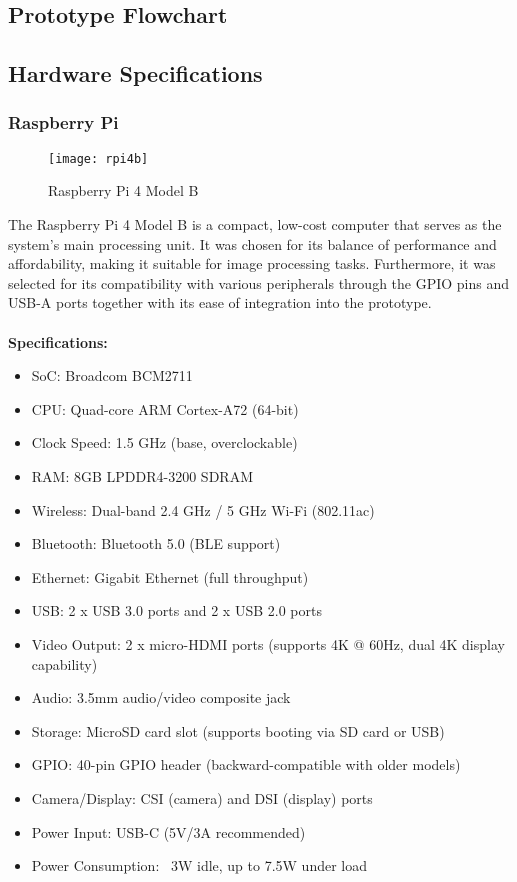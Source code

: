 \subsection{Prototype Flowchart}

\subsection{Hardware Specifications}

\subsubsection{Raspberry Pi}
\begin{figure}[!htbp]
	\centering
	\texttt{[image: rpi4b]}
	\caption{Raspberry Pi 4 Model B}
	\label{fig:rpi4b_fig}
\end{figure}
The Raspberry Pi 4 Model B is a compact, low-cost computer that serves as the system's main processing unit. 
It was chosen for its balance of performance and affordability, making it suitable for image processing tasks.
Furthermore, it was selected for its compatibility with various peripherals through the GPIO pins and USB-A ports together
with its ease of integration into the prototype.
\\
\\
\textbf{Specifications:}
\begin{itemize}
    \item SoC: Broadcom BCM2711
    \item CPU: Quad-core ARM Cortex-A72 (64-bit)
    \item Clock Speed: 1.5 GHz (base, overclockable)
    \item RAM: 8GB LPDDR4-3200 SDRAM
    \item Wireless: Dual-band 2.4 GHz / 5 GHz Wi-Fi (802.11ac)
    \item Bluetooth: Bluetooth 5.0 (BLE support)
    \item Ethernet: Gigabit Ethernet (full throughput)
    \item USB: 2 x USB 3.0 ports and 2 x USB 2.0 ports
    \item Video Output: 2 x micro-HDMI ports (supports 4K @ 60Hz, dual 4K display capability)
    \item Audio: 3.5mm audio/video composite jack
    \item Storage: MicroSD card slot (supports booting via SD card or USB)
    \item GPIO: 40-pin GPIO header (backward-compatible with older models)
    \item Camera/Display: CSI (camera) and DSI (display) ports
    \item Power Input: USB-C (5V/3A recommended)
    \item Power Consumption: ~3W idle, up to 7.5W under load
\end{itemize}


